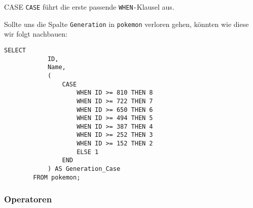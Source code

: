 \begin{sql}{CASE}
    \texttt{CASE} führt die erste passende \texttt{WHEN-}Klausel aus.

    Sollte uns die Spalte \texttt{Generation} in \texttt{pokemon} verloren gehen, könnten wie diese wir folgt nachbauen:

    \begin{lstlisting}[language=mysql]
        SELECT
            ID,
            Name,
            (
                CASE
                    WHEN ID >= 810 THEN 8
                    WHEN ID >= 722 THEN 7
                    WHEN ID >= 650 THEN 6
                    WHEN ID >= 494 THEN 5
                    WHEN ID >= 387 THEN 4
                    WHEN ID >= 252 THEN 3
                    WHEN ID >= 152 THEN 2
                    ELSE 1
                END
            ) AS Generation_Case
        FROM pokemon;
    \end{lstlisting}
\end{sql}

\subsubsection{Operatoren}

